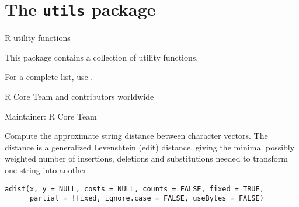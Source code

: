 
\chapter{The \texttt{utils} package}
%
\begin{Description}\relax
R utility functions
\end{Description}
%
\begin{Details}\relax
This package contains a collection of utility functions.

For a complete
list, use .

\end{Details}
%
\begin{Author}\relax
R Core Team and contributors worldwide

Maintainer: R Core Team 
\end{Author}
%
\begin{Description}\relax
Compute the approximate string distance between character vectors.
The distance is a generalized Levenshtein (edit) distance, giving the
minimal possibly weighted number of insertions, deletions and
substitutions needed to transform one string into another.
\end{Description}
%
\begin{Usage}
\begin{verbatim}
adist(x, y = NULL, costs = NULL, counts = FALSE, fixed = TRUE,
      partial = !fixed, ignore.case = FALSE, useBytes = FALSE)
\end{verbatim}
\end{Usage}
%
